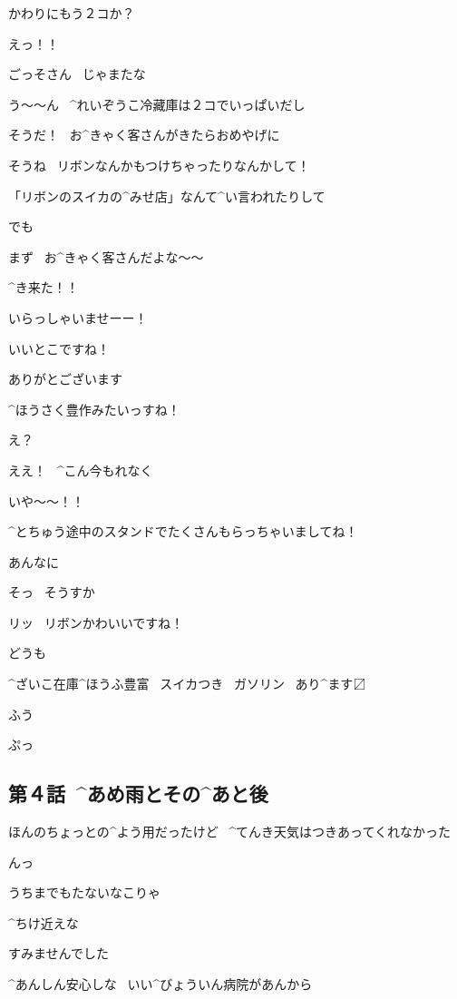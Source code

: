 \Ojisan かわりにもう２コか？

\Alpha えっ！！

\Ojisan ごっそさん
\ じゃまたな

\page
\Alpha う〜〜ん
\ ^{れいぞうこ}{冷藏庫}は２コでいっぱいだし

\page
\Alpha そうだ！
\ お^{きゃく}{客}さんがきたらおめやげに

\Alpha そうね
\ リボンなんかもつけちゃったりなんかして！

\Alpha 「リボンのスイカの^{みせ}{店}」なんて^{い}{言}われたりして

\Alpha でも

\Alpha まず
\ お^{きゃく}{客}さんだよな〜〜

\Alpha ^{き}{来}た！！

\page
\Alpha いらっしゃいませーー！

\page
\Person いいとこですね！

\Alpha ありがとございます

\Person ^{ほうさく}{豊作}みたいっすね！

\Alpha え？

\Alpha ええ！
\ ^{こん}{今}もれなく

\Person いや〜〜！！

\Person ^{とちゅう}{途中}のスタンドでたくさんもらっちゃいましてね！

\Person あんなに

\Alpha そっ
\ そうすか

\Person リッ
\ リボンかわいいですね！

\Alpha どうも

\page
\Sign ^{ざいこ}{在庫}^{ほうふ}{豊富}
\ スイカつき
\ ガソリン
\ あり^{ます}{〼}

\Alpha ふう

\Alpha ぷっ


\subsection{第４話\ ^{あめ}{雨}とその^{あと}{後}}

\page[80]
\Alpha ほんのちょっとの^{よう}{用}だったけど
\ ^{てんき}{天気}はつきあってくれなかった

\Alpha んっ

\page
\Alpha うちまでもたないなこりゃ

\page[83]
\Ojisan ^{ちけ}{近}えな

\page[85]
\Alpha すみませんでした

\Ojisan ^{あんしん}{安心}しな
\ いい^{びょういん}{病院}があんから

